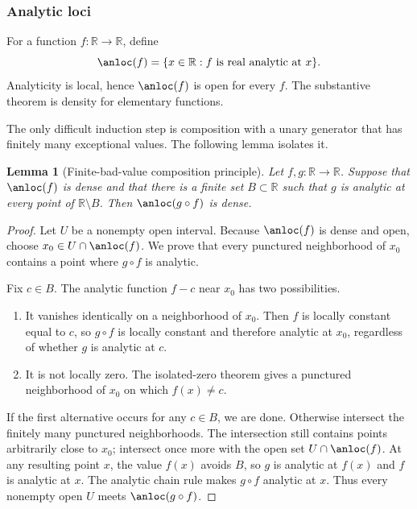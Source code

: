\documentclass[11pt,oneside]{article}
\newtheorem{lemma}[theorem]{Lemma}
\theoremstyle{definition}
\theoremstyle{remark}
\newcommand{\R}{\mathbb R}
\begin{document}
\subsubsection{Analytic loci}

For a function $f:\R\to\R$, define
\begin{equation}
 \anloc(f)=\{x\in\R:f\text{ is real analytic at }x\}.
 \label{integration:eq:analytic-locus}
\end{equation}
Analyticity is local, hence $\anloc(f)$ is open for every $f$.  The substantive theorem is
density for elementary functions.

The only difficult induction step is composition with a unary generator that has finitely
many exceptional values.  The following lemma isolates it.

\begin{lemma}[Finite-bad-value composition principle]
\label{integration:lem:finite-bad-composition}
Let $f,g:\R\to\R$.  Suppose that $\anloc(f)$ is dense and that there is a finite set
$B\subset\R$ such that $g$ is analytic at every point of $\R\setminus B$.  Then
$\anloc(g\circ f)$ is dense.
\end{lemma}

\begin{proof}
Let $U$ be a nonempty open interval.  Because $\anloc(f)$ is dense and open, choose
$x_0\in U\cap\anloc(f)$.  We prove that every punctured neighborhood of $x_0$ contains a
point where $g\circ f$ is analytic.

Fix $c\in B$.  The analytic function $f-c$ near $x_0$ has two possibilities.
\begin{enumerate}
 \item It vanishes identically on a neighborhood of $x_0$.  Then $f$ is locally constant
 equal to $c$, so $g\circ f$ is locally constant and therefore analytic at $x_0$, regardless
 of whether $g$ is analytic at $c$.
 \item It is not locally zero.  The isolated-zero theorem gives a punctured neighborhood of
 $x_0$ on which $f(x)\ne c$.
\end{enumerate}
If the first alternative occurs for any $c\in B$, we are done.  Otherwise intersect the
finitely many punctured neighborhoods.  The intersection still contains points arbitrarily
close to $x_0$; intersect once more with the open set $U\cap\anloc(f)$.  At any resulting
point $x$, the value $f(x)$ avoids $B$, so $g$ is analytic at $f(x)$ and $f$ is analytic at
$x$.  The analytic chain rule makes $g\circ f$ analytic at $x$.  Thus every nonempty open
$U$ meets $\anloc(g\circ f)$.
\end{proof}
\end{document}
